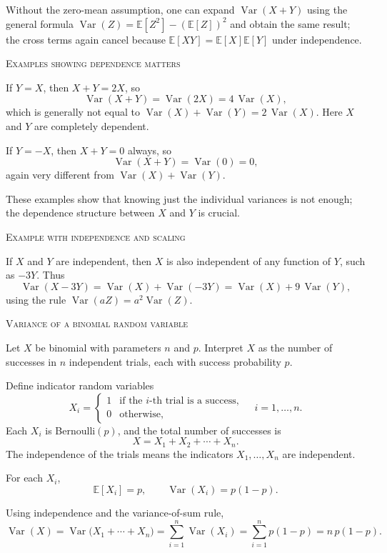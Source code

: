 Without the zero-mean assumption, one can expand \(\operatorname{Var}(X+Y)\) using the general formula \(\operatorname{Var}(Z)=\mathbb{E}[Z^2]-(\mathbb{E}[Z])^2\) and obtain the same result; the cross terms again cancel because \(\mathbb{E}[XY]=\mathbb{E}[X]\mathbb{E}[Y]\) under independence.

\bigskip\textsc{Examples showing dependence matters}

If \(Y = X\), then \(X+Y = 2X\), so
\[
\operatorname{Var}(X+Y) = \operatorname{Var}(2X) = 4\,\operatorname{Var}(X),
\]
which is generally not equal to \(\operatorname{Var}(X)+\operatorname{Var}(Y) = 2\,\operatorname{Var}(X)\).  
Here \(X\) and \(Y\) are completely dependent.

If \(Y = -X\), then \(X+Y = 0\) always, so
\[
\operatorname{Var}(X+Y) = \operatorname{Var}(0) = 0,
\]
again very different from \(\operatorname{Var}(X)+\operatorname{Var}(Y)\).  

These examples show that knowing just the individual variances is not enough; the dependence structure between \(X\) and \(Y\) is crucial.

\bigskip\textsc{Example with independence and scaling}

If \(X\) and \(Y\) are independent, then \(X\) is also independent of any function of \(Y\), such as \(-3Y\).  
Thus
\[
\operatorname{Var}(X - 3Y)
= \operatorname{Var}(X) + \operatorname{Var}(-3Y)
= \operatorname{Var}(X) + 9\,\operatorname{Var}(Y),
\]
using the rule \(\operatorname{Var}(aZ) = a^2 \operatorname{Var}(Z)\).

\bigskip\textsc{Variance of a binomial random variable}

Let \(X\) be binomial with parameters \(n\) and \(p\).  
Interpret \(X\) as the number of successes in \(n\) independent trials, each with success probability \(p\).

Define indicator random variables
\[
X_i =
\begin{cases}
1 & \text{if the \(i\)-th trial is a success},\\
0 & \text{otherwise},
\end{cases}
\quad i=1,\dots,n.
\]
Each \(X_i\) is Bernoulli\((p)\), and the total number of successes is
\[
X = X_1 + X_2 + \cdots + X_n.
\]
The independence of the trials means the indicators \(X_1,\dots,X_n\) are independent.  

For each \(X_i\),
\[
\mathbb{E}[X_i] = p, \qquad \operatorname{Var}(X_i) = p(1-p).
\]

Using independence and the variance-of-sum rule,
\[
\operatorname{Var}(X)
= \operatorname{Var}\bigl(X_1 + \cdots + X_n\bigr)
= \sum_{i=1}^{n} \operatorname{Var}(X_i)
= \sum_{i=1}^{n} p(1-p)
= n\,p(1-p).
\]

